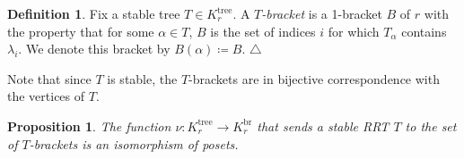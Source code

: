 \documentclass[11pt]{amsart}
\newtheorem{proposition}[theorem]{Proposition}
\theoremstyle{definition}
\newtheorem{definition}[theorem]{Definition}
\theoremstyle{remark}
\theoremstyle{plain}
\newcommand{\on}{\operatorname}
\newcommand{\tree}{{\on{tree}}}
\newcommand{\br}{{\on{br}}}
\begin{document}
\begin{definition}
\label{def:T_bracket}
Fix a stable tree $T \in K_r^\tree$.
A \emph{$T$-bracket} is a 1-bracket $B$ of $r$ with the property that for some $\alpha \in T$, $B$ is the set of indices $i$ for which $T_\alpha$ contains $\lambda_i$.
\label{p:Balpha}
We denote this bracket by $B(\alpha) \coloneqq B$.
\null\hfill$\triangle$
\end{definition}

\noindent Note that since $T$ is stable, the $T$-brackets are in bijective correspondence with the vertices of $T$.

\begin{proposition}
\label{prop:Kr_iso}
\label{p:nu}
The function $\nu\colon K_r^\tree \to K_r^\br$ that sends a stable RRT $T$ to the set of $T$-brackets is an isomorphism of posets.
\end{proposition}
\end{document}
